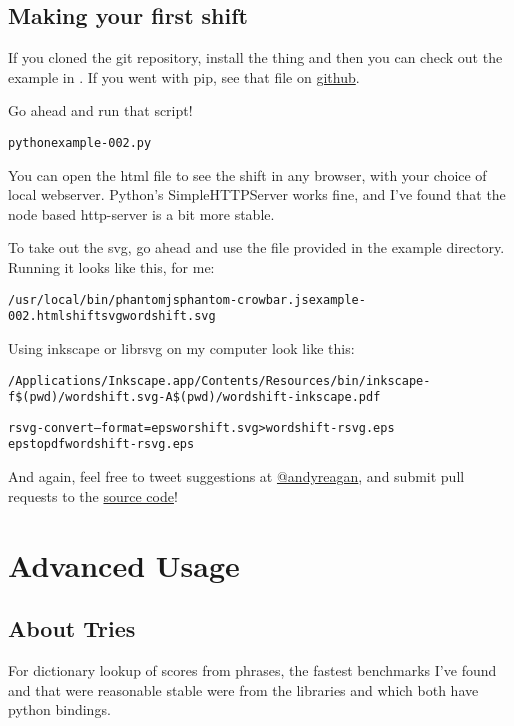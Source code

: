 \documentclass[letterpaper,10pt,english]{sphinxmanual}
\begin{document}
\section{Making your first shift}
\label{wordshifts:making-your-first-shift}
If you cloned the git repository, install the thing and then you can check out the example in .
If you went with pip, see that file on \href{https://github.com/andyreagan/labMT-simple/blob/master/examples/example.py}{github}.

Go ahead and run that script!
\begin{alltt}
python example-002.py
\end{alltt}

You can open the html file to see the shift in any browser, with your choice of local webserver.
Python's SimpleHTTPServer works fine, and I've found that the node based http-server is a bit more stable.

To take out the svg, go ahead and use the  file provided in the example directory.
Running it looks like this, for me:
\begin{alltt}
/usr/local/bin/phantomjs phantom-crowbar.js example-002.html shiftsvg wordshift.svg
\end{alltt}

Using inkscape or librsvg on my computer look like this:
\begin{alltt}
/Applications/Inkscape.app/Contents/Resources/bin/inkscape -f \$(pwd)/wordshift.svg -A \$(pwd)/wordshift-inkscape.pdf

rsvg-convert --format=eps worshift.svg \textgreater{} wordshift-rsvg.eps
epstopdf wordshift-rsvg.eps
\end{alltt}

And again, feel free to tweet suggestions at \href{https://twitter.com/andyreagan}{@andyreagan}, and submit pull requests to the \href{https://github.com/andyreagan/labMT-simple}{source code}!


\chapter{Advanced Usage}
\label{advanced::doc}\label{advanced:advanced-usage}

\section{About Tries}
\label{advanced:about-tries}
For dictionary lookup of scores from phrases, the fastest benchmarks I've found and that were reasonable stable were from the libraries  and  which both have python bindings.
\end{document}
